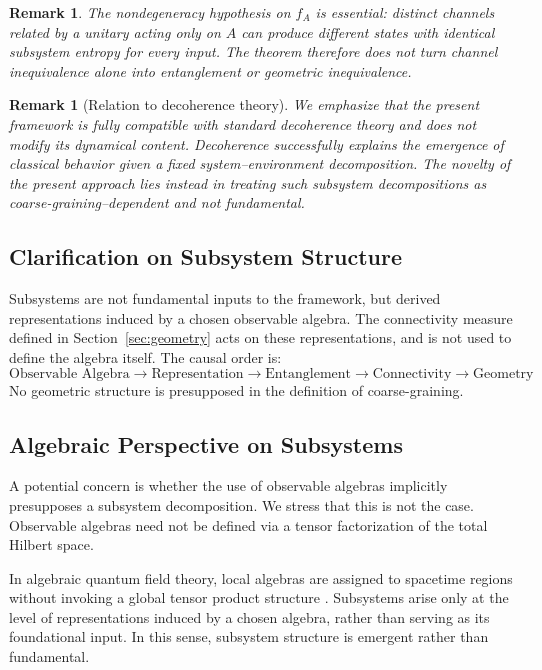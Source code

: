 \documentclass[12pt,a4paper]{article}
\newtheorem{remark}[theorem]{Remark}
\begin{document}
\begin{remark}
The nondegeneracy hypothesis on $f_A$ is essential: distinct channels related by a unitary acting only on $A$ can produce different states with identical subsystem entropy for every input.  The theorem therefore does not turn channel inequivalence alone into entanglement or geometric inequivalence.
\end{remark}

\begin{remark}[Relation to decoherence theory]
We emphasize that the present framework is fully compatible with standard decoherence theory and does not modify its dynamical content. 
Decoherence successfully explains the emergence of classical behavior given a fixed system--environment decomposition. 
The novelty of the present approach lies instead in treating such subsystem decompositions as coarse-graining--dependent and not fundamental.
\end{remark}

\subsection{Clarification on Subsystem Structure}

Subsystems are not fundamental inputs to the framework, but derived representations induced by a chosen observable algebra. 
The connectivity measure defined in Section~\ref{sec:geometry} acts on these representations, and is not used to define the algebra itself. 
The causal order is:
\[
\text{Observable Algebra} \to \text{Representation} \to \text{Entanglement} \to \text{Connectivity} \to \text{Geometry}
\]
No geometric structure is presupposed in the definition of coarse-graining.

\subsection{Algebraic Perspective on Subsystems}

A potential concern is whether the use of observable algebras implicitly presupposes a subsystem decomposition. 
We stress that this is not the case. 
Observable algebras need not be defined via a tensor factorization of the total Hilbert space.

In algebraic quantum field theory, local algebras are assigned to spacetime regions without invoking a global tensor product structure \cite{Haag1996}. 
Subsystems arise only at the level of representations induced by a chosen algebra, rather than serving as its foundational input. 
In this sense, subsystem structure is emergent rather than fundamental.
\end{document}

